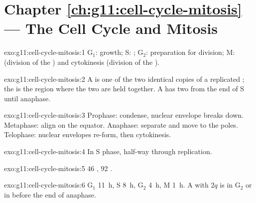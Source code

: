 \section*{Chapter \ref{ch:g11:cell-cycle-mitosis} --- The Cell Cycle and Mitosis}

\begin{solution}{exo:g11:cell-cycle-mitosis:1}
$\mathrm{G_1}$: growth; S: ; $\mathrm{G_2}$:
preparation for division; M:  (division of the ) and
cytokinesis (division of the ).
\end{solution}

\begin{solution}{exo:g11:cell-cycle-mitosis:2}
A  is one of the two identical copies of a replicated
; the  is the region where the two are held
together. A  has two  from the end of S until
anaphase.
\end{solution}

\begin{solution}{exo:g11:cell-cycle-mitosis:3}
Prophase:  condense, nuclear envelope breaks down.
Metaphase:  align on the equator. Anaphase: 
separate and move to the poles. Telophase: nuclear envelopes re-form,
then cytokinesis.
\end{solution}

\begin{solution}{exo:g11:cell-cycle-mitosis:4}
In S phase, half-way through replication.
\end{solution}

\begin{solution}{exo:g11:cell-cycle-mitosis:5}
46 , 92 .
\end{solution}

\begin{solution}{exo:g11:cell-cycle-mitosis:6}
$\mathrm{G_1}$ \qty{11}{h}, S \qty{8}{h}, $\mathrm{G_2}$ \qty{4}{h},
M \qty{1}{h}. A  with $2q$ is in $\mathrm{G_2}$ or in 
before the end of anaphase.
\end{solution}


